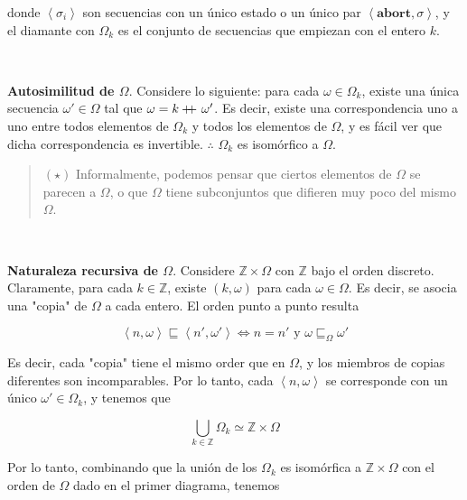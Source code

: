 \documentclass[article, 12pt]{article}
\newcommand\doubleplus{+\kern-1.3ex+\kern0.8ex}
\begin{document}
donde $\left<\sigma_i \right>$ son secuencias con un único estado o un único par
$\left<\textbf{abort}, \sigma \right>$, y el diamante con $\Omega_k$ es el conjunto de
secuencias que empiezan con el entero $k$.

~

\textbf{Autosimilitud de $\Omega$}. Considere lo siguiente: para cada $\omega \in \Omega_k$, existe una única
secuencia $\omega'\in \Omega$ tal que $\omega = k \doubleplus \omega'$. Es
decir, existe una correspondencia uno a uno entre todos elementos de $\Omega_k$ y
todos los elementos de $\Omega$, y es fácil ver que dicha correspondencia es
invertible. $\therefore $ $\Omega_k$ es isomórfico a $\Omega$.

\begin{quote}
$(\star)$ Informalmente, podemos pensar que ciertos elementos de $\Omega$ se parecen a
$\Omega$, o que $\Omega$ tiene subconjuntos que difieren muy poco del mismo
$\Omega$.
\end{quote}
~ 

\textbf{Naturaleza recursiva de $\Omega$}. Considere $\mathbb{Z} \times \Omega$ con $\mathbb{Z}$ bajo el orden discreto.
Claramente, para cada $k \in \mathbb{Z}$, existe $(k, \omega)$ para cada $\omega
\in \Omega$. Es decir, se asocia una "copia" de $\Omega$ a cada entero. El orden
punto a punto resulta 

\begin{equation*}
  \left<n, \omega \right> \sqsubseteq \left<n', \omega' \right> 
\iff n = n' \text{ y } \omega
  \sqsubseteq_\Omega \omega'
\end{equation*}

Es decir, cada "copia" tiene el mismo order que en $\Omega$, y los miembros de
copias diferentes son incomparables. Por lo tanto, cada $\left<n,
\omega\right>$ se corresponde con un único $\omega' \in \Omega_k$, y tenemos que 

\begin{equation*}
  \bigcup_{k \in \mathbb{Z}} \Omega_k \simeq \mathbb{Z} \times \Omega
\end{equation*}

Por lo tanto, combinando que la unión de los $\Omega_k$ es isomórfica a $\mathbb{Z} \times
\Omega$ con el orden de $\Omega$ dado en el primer diagrama, tenemos

\begin{figure}
\centering
{}
\end{figure} 
\end{document}
